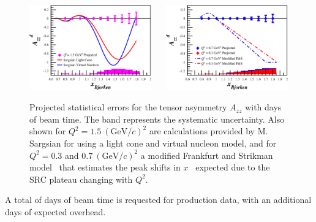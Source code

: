 \begin{figure}
\begin{center}
\includegraphics[width=0.47\textwidth]{figs/Pzz_30_q2_15_Azz_w_misak.eps} ~~ \includegraphics[width=0.47\textwidth]{figs/Pzz_30_q2_03_07_Azz_fs.eps} 
\caption{\label{PROJ}Projected statistical errors for the tensor asymmetry $A_{zz}$ with \productiondays days of beam time. The band represents the systematic uncertainty. Also shown for $Q^2=1.5~(\mathrm{GeV}/c)^2$ are calculations provided by M. Sargsian for using a light cone and virtual nucleon model, and for $Q^2=0.3$ and $0.7~(\mathrm{GeV}/c)^2$ a modified Frankfurt and Strikman model~\cite{Frankfurt:1988nt} that estimates the peak shifts in $x$~\cite{Frankfurt:2008zv} expected due to the SRC plateau changing with $Q^2$.
}
\end{center}
\end{figure}

A total of \productiondays days of beam time is requested for production data, with an additional \overheaddays days of expected overhead.



\clearpage

%





